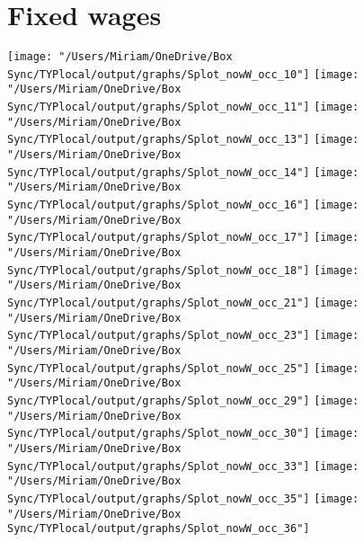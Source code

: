 \documentclass[11pt]{article}
\begin{document}
\newpage
\section{Fixed wages}

\texttt{[image: "/Users/Miriam/OneDrive/Box Sync/TYPlocal/output/graphs/Splot\_nowW\_occ\_10"]}
\newline
\texttt{[image: "/Users/Miriam/OneDrive/Box Sync/TYPlocal/output/graphs/Splot\_nowW\_occ\_11"]}
\newline
\texttt{[image: "/Users/Miriam/OneDrive/Box Sync/TYPlocal/output/graphs/Splot\_nowW\_occ\_13"]}
\newline
\texttt{[image: "/Users/Miriam/OneDrive/Box Sync/TYPlocal/output/graphs/Splot\_nowW\_occ\_14"]}
\newline
\texttt{[image: "/Users/Miriam/OneDrive/Box Sync/TYPlocal/output/graphs/Splot\_nowW\_occ\_16"]}
\newline
\texttt{[image: "/Users/Miriam/OneDrive/Box Sync/TYPlocal/output/graphs/Splot\_nowW\_occ\_17"]}
\newline
\texttt{[image: "/Users/Miriam/OneDrive/Box Sync/TYPlocal/output/graphs/Splot\_nowW\_occ\_18"]}
\newline
\texttt{[image: "/Users/Miriam/OneDrive/Box Sync/TYPlocal/output/graphs/Splot\_nowW\_occ\_21"]}
\newline
\texttt{[image: "/Users/Miriam/OneDrive/Box Sync/TYPlocal/output/graphs/Splot\_nowW\_occ\_23"]}
\newline
\texttt{[image: "/Users/Miriam/OneDrive/Box Sync/TYPlocal/output/graphs/Splot\_nowW\_occ\_25"]}
\newline
\texttt{[image: "/Users/Miriam/OneDrive/Box Sync/TYPlocal/output/graphs/Splot\_nowW\_occ\_29"]}
\newline
\texttt{[image: "/Users/Miriam/OneDrive/Box Sync/TYPlocal/output/graphs/Splot\_nowW\_occ\_30"]}
\newline
\texttt{[image: "/Users/Miriam/OneDrive/Box Sync/TYPlocal/output/graphs/Splot\_nowW\_occ\_33"]}
\newline
\texttt{[image: "/Users/Miriam/OneDrive/Box Sync/TYPlocal/output/graphs/Splot\_nowW\_occ\_35"]}
\newline
\texttt{[image: "/Users/Miriam/OneDrive/Box Sync/TYPlocal/output/graphs/Splot\_nowW\_occ\_36"]}
\end{document}
